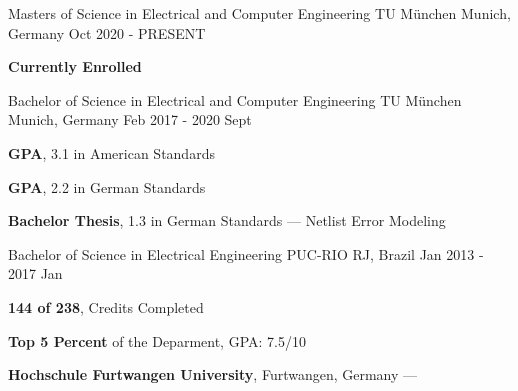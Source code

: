 
\begin{cventries}
  \cventry
    {Masters of Science in Electrical and Computer Engineering} %
    {TU München} %
    {Munich, Germany} %
    {Oct 2020 - PRESENT} %
    {
      \begin{cvitems} %
      \item {\textbf{Currently Enrolled}}
      \end{cvitems}
    }

  \cventry
    {Bachelor of Science in Electrical and Computer Engineering} %
    {TU München} %
    {Munich, Germany} %
    {Feb 2017 - 2020 Sept} %
    {
      \begin{cvitems} %
      \item {\textbf{GPA}, 3.1 in American Standards}
         \vspace{0.5mm}
         \item {\textbf{GPA}, 2.2 in German Standards}
         \vspace{0.5mm}
         \item {\textbf{Bachelor Thesis}, 1.3 in German Standards --- Netlist Error Modeling}
      \end{cvitems}
    }

  \cventry
    {Bachelor of Science in Electrical Engineering} %
    {PUC-RIO} %
    {RJ, Brazil} %
    {Jan 2013 - 2017 Jan} %
    {
      \begin{cvitems} %
        \item {\textbf{144 of 238}, Credits Completed}
        \vspace{0.5mm}
        \item {\textbf{Top 5 Percent} of the Deparment, GPA: 7.5/10}
        \vspace{0.5mm}
        \item {\textbf{Hochschule Furtwangen University}, Furtwangen, Germany --- }
      \end{cvitems}
    }
\end{cventries}
